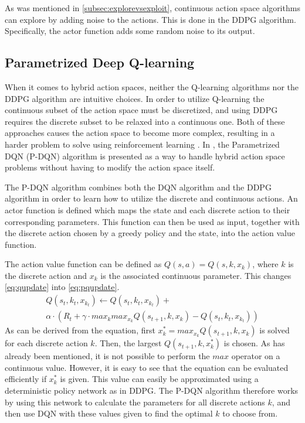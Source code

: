 \documentclass{kththesis}
\begin{document}
As was mentioned in \autoref{subsec:explorevsexploit}, continuous action space algorithms can explore by adding noise to the actions. This is done in the DDPG algorithm. Specifically, the actor function adds some random noise to its output. \parencite{lillicrap2015continuous}

\subsection{Parametrized Deep Q-learning}
When it comes to hybrid action spaces, neither the Q-learning algorithms nor the DDPG algorithm are intuitive choices. In order to utilize Q-learning the continuous subset of the action space must be discretized, and using DDPG requires the discrete subset to be relaxed into a continuous one. Both of these approaches causes the action space to become more complex, resulting in a harder problem to solve using reinforcement learning \parencite{xiong2018parametrized}. In \parencite{xiong2018parametrized}, the Parametrized DQN (P-DQN) algorithm is presented as a way to handle hybrid action space problems without having to modify the action space itself.

The P-DQN algorithm combines both the DQN algorithm and the DDPG algorithm in order to learn how to utilize the discrete and continuous actions. An actor function is defined which maps the state and each discrete action to their corresponding parameters. This function can then be used as input, together with the discrete action chosen by a greedy policy and the state, into the action value function. 

The action value function can be defined as $Q(s, a) = Q(s, k, x_k)$, where $k$ is the discrete action and $x_k$ is the associated continuous parameter. This changes \autoref{eq:qupdate} into \autoref{eq:pqupdate}. 
\begin{equation}
\label{eq:pqupdate}
\begin{split}
Q(s_t, k_t, x_{k_t}) \leftarrow Q(s_t, k_t, x_{k_t}) + \\ \alpha \cdot (R_t + \gamma \cdot max_k max_{x_k} Q(s_{t+1}, k, x_k) - Q(s_t, k_t, x_{k_t}))
\end{split}
\end{equation}
As can be derived from the equation, first $x_k^* = max_{x_k}Q(s_{t+1}, k, x_k)$ is solved for each discrete action $k$. Then, the largest $Q(s_{t+1}, k, x_k^*)$ is chosen. As has already been mentioned, it is not possible to perform the $max$ operator on a continuous value. However, it is easy to see that the equation can be evaluated efficiently if $x_k^*$ is given. This value can easily be approximated using a deterministic policy network as in DDPG. The P-DQN algorithm therefore works by using this network to calculate the parameters for all discrete actions $k$, and then use DQN with these values given to find the optimal $k$ to choose from. \parencite{xiong2018parametrized}
\end{document}
